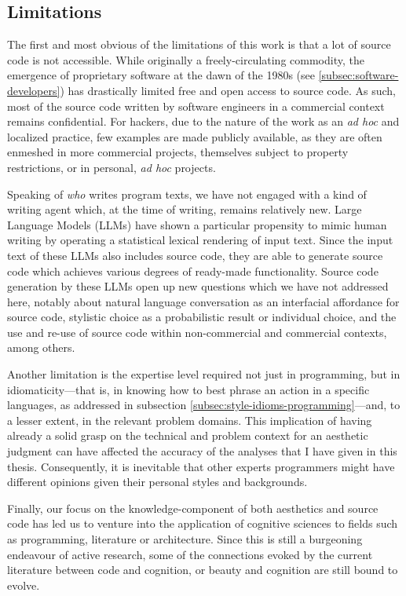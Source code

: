 \subsection{Limitations}
\label{subsec:conclusion-limitations}

The first and most obvious of the limitations of this work is that a lot of source code is not accessible. While originally a freely-circulating commodity, the emergence of proprietary software at the dawn of the 1980s (see \autoref{subsec:software-developers}) has drastically limited free and open access to source code. As such, most of the source code written by software engineers in a commercial context remains confidential. For hackers, due to the nature of the work as an \emph{ad hoc} and localized practice, few examples are made publicly available, as they are often enmeshed in more commercial projects, themselves subject to property restrictions, or in personal, \emph{ad hoc} projects.

Speaking of \emph{who} writes program texts, we have not engaged with a kind of writing agent which, at the time of writing, remains relatively new. Large Language Models (LLMs) have shown a particular propensity to mimic human writing by operating a statistical lexical rendering of input text. Since the input text of these LLMs also includes source code, they are able to generate source code which achieves various degrees of ready-made functionality. Source code generation by these LLMs open up new questions which we have not addressed here, notably about natural language conversation as an interfacial affordance for source code, stylistic choice as a probabilistic result or individual choice, and the use and re-use of source code within non-commercial and commercial contexts, among others.

Another limitation is the expertise level required not just in programming, but in idiomaticity—that is, in knowing how to best phrase an action in a specific languages, as addressed in subsection \autoref{subsec:style-idioms-programming}—and, to a lesser extent, in the relevant problem domains. This implication of having already a solid grasp on the technical and problem context for an aesthetic judgment can have affected the accuracy of the analyses that I have given in this thesis. Consequently, it is inevitable that other experts programmers might have different opinions given their personal styles and backgrounds.

Finally, our focus on the knowledge-component of both aesthetics and source code has led us to venture into the application of cognitive sciences to fields such as programming, literature or architecture. Since this is still a burgeoning endeavour of active research,  some of the connections evoked by the current literature between code and cognition, or beauty and cognition are still bound to evolve.

